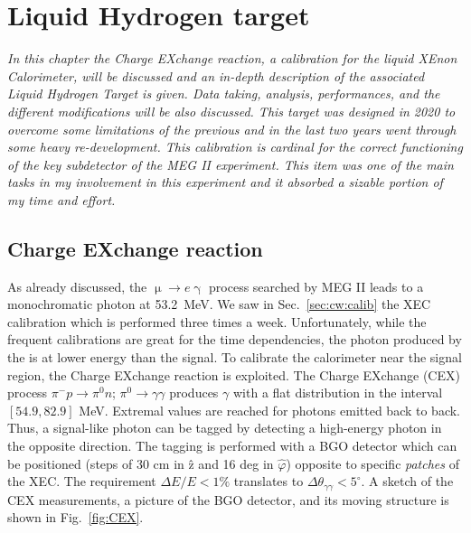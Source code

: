 \chapter{Liquid Hydrogen target}
\label{ch:MEG:CEX}
\begin{refsection}
{\itshape In this chapter the Charge EXchange reaction, a calibration for the liquid XEnon Calorimeter, will be discussed and an in-depth description of the associated Liquid Hydrogen Target is given. 
Data taking, analysis, performances, and the different modifications will be also discussed.
This target was designed in 2020 to overcome some limitations of the previous and in the last two years went through some heavy re-development.
This calibration is cardinal for the correct functioning of the key subdetector of the MEG II experiment. 
This item was one of the main tasks in my involvement in this experiment and it absorbed a sizable portion of my time and effort.}

\section{Charge EXchange reaction}
    As already discussed, the $\upmu \rightarrow e\upgamma$ process searched by MEG II leads to a monochromatic photon at \SI{53.2}{MeV}.
    We saw in Sec.~\ref{sec:cw:calib} the XEC calibration which is performed three times a week. 
    Unfortunately, while the frequent calibrations are great for the time dependencies, the photon produced by the  is at lower energy than the signal.
    To calibrate the calorimeter near the signal region, the Charge EXchange reaction is exploited.
    The Charge EXchange (CEX) process $\pi^-p\rightarrow \pi^0n$; $\pi^0\rightarrow\gamma\gamma$ produces $\gamma$ with a flat distribution in the interval $[54.9,82.9]$ MeV.
    Extremal values are reached for photons emitted back to back. Thus, a signal-like photon can be tagged by detecting a high-energy photon in the opposite direction.
    The tagging is performed with a BGO detector which can be positioned (steps of 30 cm in \^{z} and 16 deg in $\hat{\varphi}$) opposite to specific \textit{patches} of the XEC.
    The requirement $\Delta E/E< 1\%$ translates to $\Delta \theta_{\gamma\gamma}<5^\circ$.
    A sketch of the CEX measurements, a picture of the BGO detector, and its moving structure is shown in Fig.~\ref{fig:CEX}.


\end{refsection}
